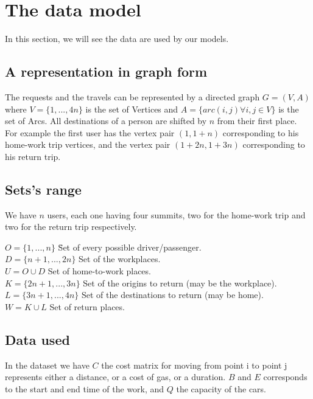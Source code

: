 \documentclass[12pt, a4paper,twoside]{memoir}
\newcommand\tab[1][1cm]{\hspace*{#1}}
\begin{document}
	\section{The data model}
	In this section, we will see the data are used by our models.
	
	\subsection{A representation in graph form}
	The requests and the travels can be represented by a directed graph $G=(V,A)$ where $V=\{1,...,4n\}$ is the set of Vertices and $A=\{arc(i,j) \forall i,j \in V\}$ is the set of Arcs. \newline
	All destinations of a person are shifted by $n$ from their first place. \newline
	For example the first user has the vertex pair $(1,1+n)$ corresponding to his home-work trip vertices, and the vertex pair $(1+2n,1+3n)$ corresponding to his return trip.

	\subsection{Sets's range} 
	
	We have $n$ users, each one having four summits, two for the home-work trip and two for the return trip respectively. 
	
	\begin{tabbing}
		$O=\{1,...,n\}$ \tab \tab \= Set of every possible driver/passenger. \\
		$D=\{n+1,...,2n\}$ \> Set of the workplaces. \\
		$U=O\cup D$ \> Set of home-to-work places. \\
	
		$K=\{2n+1,...,3n\}$ \> Set of the origins to return (may be the workplace). \\
		$L=\{3n+1,...,4n\}$ \> Set of the destinations to return (may be home). \\
		$W=K\cup L$ \> Set of return places. \\
	\end{tabbing}
	
	\subsection{Data used}
	In the dataset we have $C$ the cost matrix for moving from point i to point j represents either a distance, or a cost of gas, or a duration. $B$ and $E$ corresponds to the start and end time of the work, and $Q$ the capacity of the cars.
	
\end{document}
